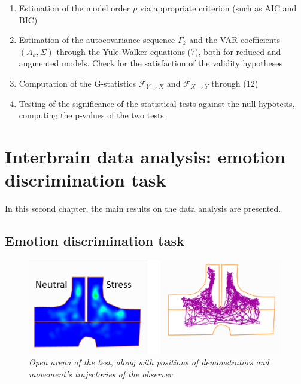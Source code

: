 \documentclass[a4paper]{article}
\begin{document}
\begin{enumerate}
	\item Estimation of the model order $p$ via appropriate criterion (such as AIC and BIC)
	
	\item Estimation of the autocovariance sequence $\Gamma_k$ and the VAR coefficients $(A_k, \Sigma)$ through the Yule-Walker equations (7), both for reduced and augmented models. Check for the satisfaction of the validity hypotheses
	
	\item Computation of the G-statistics $ \mathcal{F}_{Y \rightarrow X} $ and $ \mathcal{F}_{X \rightarrow Y} $ through (12)
	
	\item Testing of the significance of the statistical tests against the null hypotesis, computing the p-values of the two tests 
	
\end{enumerate}






\newpage
\section{Interbrain data analysis: emotion discrimination task}

In this second chapter, the main results on the data analysis are presented.


\subsection{Emotion discrimination task}

\begin{figure}[H]
	\begin{center}
		\includegraphics[scale=.90]{arena.png} 
	\end{center} 
	\caption{\textit{Open arena of the test, along with positions of demonstrators and movement's trajectories of the observer}}
	
\end{figure}
\end{document}
